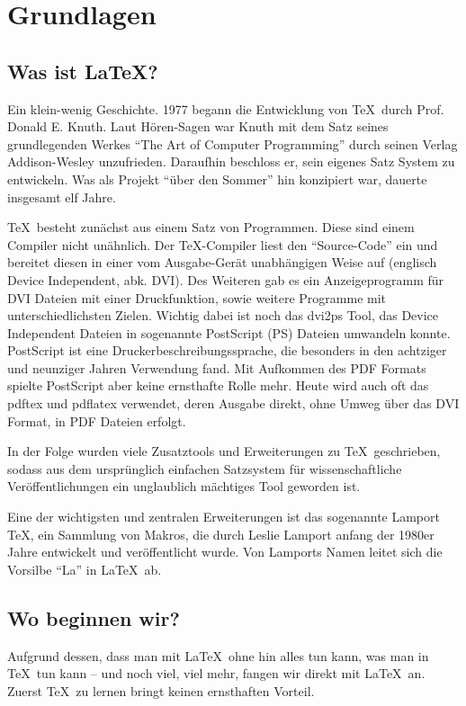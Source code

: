 
\chapter{Grundlagen}

\section{Was ist \LaTeX ?}

Ein klein-wenig Geschichte. 1977 begann die Entwicklung von \TeX\ durch Prof. Donald E. Knuth. Laut Hören-Sagen war Knuth mit dem Satz seines grundlegenden Werkes "`The Art of Computer Programming"' durch seinen Verlag Ad\-di\-son-Wesley unzufrieden. Daraufhin beschloss er, sein eigenes Satz System zu entwickeln. Was als Projekt "`über den Sommer"' hin konzipiert war, dauerte insgesamt elf Jahre. 

\TeX\ besteht zunächst aus einem Satz von Programmen. Diese sind einem Compiler nicht unähnlich. Der \TeX-Compiler liest den "`Source-Code"' ein und bereitet diesen in einer vom Ausgabe-Gerät unabhängigen Weise auf (englisch Device Independent, abk. DVI). Des Weiteren gab es ein Anzeigeprogramm für DVI Dateien mit einer Druckfunktion, sowie weitere Programme mit unterschiedlichsten Zielen. Wichtig dabei ist noch das dvi2ps Tool, das Device Independent Dateien in sogenannte PostScript (PS) Dateien umwandeln konnte. PostScript ist eine Druckerbeschreibungssprache, die besonders in den achtziger und neunziger Jahren Verwendung fand. Mit Aufkommen des PDF Formats spielte PostScript aber keine ernsthafte Rolle mehr. Heute wird auch oft das pdftex und pdflatex verwendet, deren Ausgabe direkt, ohne Umweg über das DVI Format, in PDF Dateien erfolgt. 

In der Folge wurden viele Zusatztools und Erweiterungen zu \TeX\ geschrieben, sodass aus dem ursprünglich einfachen Satzsystem für wissenschaftliche Veröffentlichungen ein unglaublich mächtiges Tool geworden ist. 

Eine der wichtigsten und zentralen Erweiterungen ist das sogenannte Lamport \TeX, ein Sammlung von Makros, die durch Leslie Lamport anfang der 1980er Jahre entwickelt und veröffentlicht wurde. Von Lamports Namen leitet sich die Vorsilbe "`La"' in \LaTeX\ ab.

\section{Wo beginnen wir?}

Aufgrund dessen, dass man mit \LaTeX\ ohne hin alles tun kann, was man in \TeX\ tun kann -- und noch viel, viel mehr, fangen wir direkt mit \LaTeX\ an. Zuerst \TeX\ zu lernen bringt keinen ernsthaften Vorteil. 

